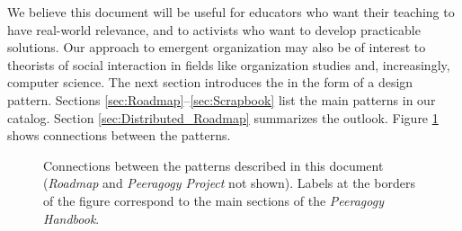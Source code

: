 We believe this document will be useful for educators who want their teaching to have real-world relevance, and to activists who want to develop practicable solutions.   Our approach to emergent organization may also be of interest to theorists of social interaction in fields like organization studies and, increasingly, computer science.  The next section introduces the  in the form of a design pattern.  Sections \ref{sec:Roadmap}--\ref{sec:Scrapbook} list the main patterns in our catalog.  Section \ref{sec:Distributed_Roadmap} summarizes the outlook.  Figure \ref{fig:connections} shows connections between the patterns.

\begin{figure}
\vspace{-.9in}
{\centering


\par
}
\vspace{-.9in}
\caption{Connections between the patterns described in this document (\emph{Roadmap} and \emph{Peeragogy Project} not shown).  Labels at the borders of the figure correspond to the main sections of the \emph{Peeragogy Handbook}.\label{fig:connections}}
\end{figure}
